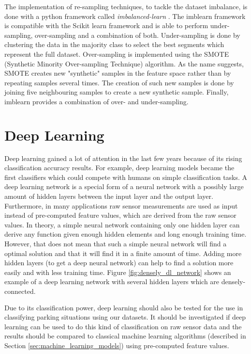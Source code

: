 The implementation of re-sampling techniques, to tackle the dataset imbalance, is done with a python framework called \emph{imbalanced-learn} \cite{imblearn_reference}. The imblearn framework is compatible with the Scikit learn framework and is able to perform under-sampling, over-sampling and a combination of both. Under-sampling is done by clustering the data in the majority class to select the best segments which represent the full dataset. Over-sampling is implemented using the SMOTE (Synthetic Minority Over-sampling Technique) algorithm. As the name suggests, SMOTE creates new "synthetic" samples in the feature space rather than by repeating samples several times. The creation of such new samples is done by joining five neighbouring samples to create a new synthetic sample. Finally, imblearn provides a combination of over- and under-sampling.







\section{Deep Learning}
\label{sec:deep_learning}

Deep learning gained a lot of attention in the last few years because of its rising classification accuracy results. For example, deep learning models became the first classifiers which could compete with humans on simple classification tasks. A deep learning network is a special form of a neural network with a possibly large amount of hidden layers between the input layer and the output layer. Furthermore, in many applications raw sensor measurements are used as input instead of pre-computed feature values, which are derived from the raw sensor values. In theory, a simple neural network containing only one hidden layer can derive any function given enough hidden elements and long enough training time. However, that does not mean that such a simple neural network will find a optimal solution and that it will find it in a finite amount of time. Adding more hidden layers (to get a deep neural network) can help to find a solution more easily and with less training time. 
Figure \ref{fig:densely_dl_network} shows an example of a deep learning network with several hidden layers which are densely-connected.

Due to its classification power, deep learning should also be tested for the use in classifying parking situations using our datasets. It should be investigated if deep learning can be used to do this kind of classification on raw sensor data and the results should be compared to classical machine learning algorithms (described in Section \ref{sec:machine_learning_models}) using pre-computed feature values.

